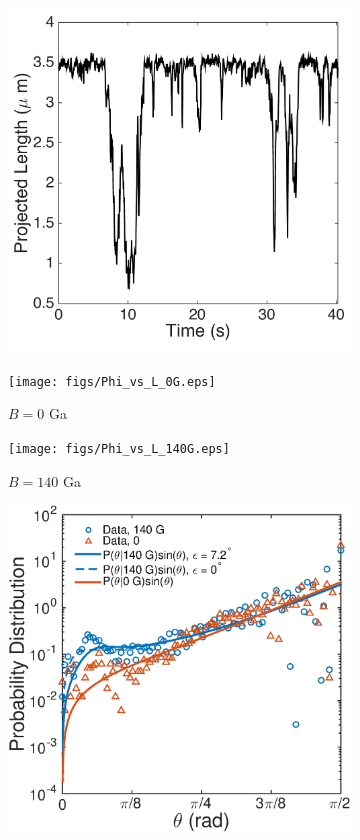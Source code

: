 \documentclass[aps,prl,superscriptaddress]{revtex4-1}
\begin{document}
\begin{figure}
\begin{subfigure}[t]{0.26\columnwidth}
    	\caption{\label{vertical}}
    \end{subfigure}
    \begin{subfigure}[t]{0.26\columnwidth}
    	\includegraphics[width=\textwidth]{figs/Figure3bc}
    	\caption{\label{timeseries}}
    \end{subfigure}
    \begin{subfigure}[b]{0.44\columnwidth}
    	\texttt{[image: figs/Phi\_vs\_L\_0G.eps]}
    	\caption{$B = 0$ Ga \label{Pxy_data}}
    \end{subfigure}
    \begin{subfigure}[b]{0.44\columnwidth}
    	\texttt{[image: figs/Phi\_vs\_L\_140G.eps]}
    	\caption{$B = 140$ Ga \label{Pxy_data2}}
    \end{subfigure}
    \begin{subfigure}[b]{0.88\columnwidth}
    	\includegraphics[width=\textwidth]{figs/Figure3a.eps}

\end{subfigure}
\end{figure}
\end{document}
